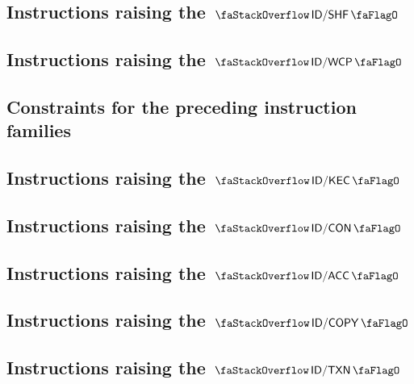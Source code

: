\subsection{Instructions raising the $\stackDecShfFlag$           \lispDone{}}   \label{hub: instruction handling: shf}                    
\subsection{Instructions raising the $\stackDecWcpFlag$           \lispDone{}}   \label{hub: instruction handling: wcp}                    
\subsection{Constraints for the preceding instruction families    \lispDone{}}   \label{hub: instruction handling: stateless constraints}  
\subsection{Instructions raising the $\stackDecKecFlag$           \lispDone{}}   \label{hub: instruction handling: kec}                    
\subsection{Instructions raising the $\stackDecConFlag$           \lispDone{}}   \label{hub: instruction handling: con}                    
\subsection{Instructions raising the $\stackDecAccFlag$           \lispDone{}}   \label{hub: instruction handling: acc}                    
\subsection{Instructions raising the $\stackDecCopyFlag$          \lispDone{}}   \label{hub: instruction handling: copy}                   
\subsection{Instructions raising the $\stackDecTxnFlag$           \lispDone{}}   \label{hub: instruction handling: txn}                    
